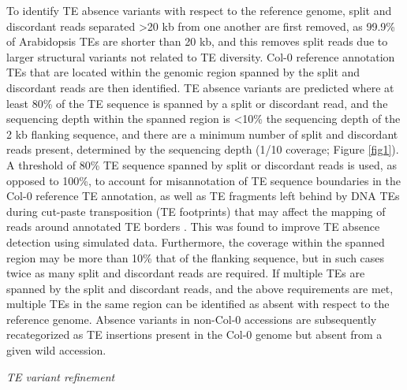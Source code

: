 \documentclass[12pt]{article}
\begin{document}
To identify TE absence variants with respect to the reference genome,
split and discordant reads separated \textgreater{}20 kb from one
another are first removed, as 99.9\% of Arabidopsis TEs are shorter than
20 kb, and this removes split reads due to larger structural variants
not related to TE diversity. Col-0 reference annotation TEs that
are located within the genomic region
spanned by the split and discordant reads are then identified. TE
absence variants are predicted where at least 80\% of the TE sequence is
spanned by a split or discordant read, and the sequencing depth within
the spanned region is \textless{}10\% the sequencing depth of the 2 kb
flanking sequence, and there are a minimum number of split and
discordant reads present, determined by the sequencing depth (1/10
coverage; Figure \ref{fig1}). A threshold of 80\% TE sequence spanned by split
or discordant reads is used, as opposed to 100\%, to account for
misannotation of TE sequence boundaries in the Col-0 reference TE
annotation, as well as TE fragments left behind by DNA TEs during
cut-paste transposition (TE footprints) that may affect the mapping of
reads around annotated TE borders \cite{Plasterk:1991vd}. This was found
to improve TE absence detection using simulated data. Furthermore, the
coverage within the spanned region may be more than 10\% that of the
flanking sequence, but in such cases twice as many split and discordant
reads are required. If multiple TEs are spanned by the split and
discordant reads, and the above requirements are met, multiple TEs in
the same region can be identified as absent with respect to the
reference genome. Absence variants in non-Col-0 accessions are
subsequently recategorized as TE insertions present in the Col-0 genome
but absent from a given wild accession.

\emph{TE variant refinement}
\end{document}
